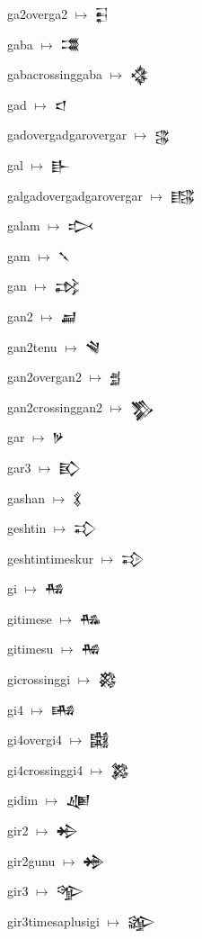{\noindent ga2overga2 $\mapsto$ {\cufont 𒃭}\par
\noindent gaba $\mapsto$ {\cufont 𒃮}\par
\noindent gabacrossinggaba $\mapsto$ {\cufont 𒃯}\par
\noindent gad $\mapsto$ {\cufont 𒃰}\par
\noindent gadovergadgarovergar $\mapsto$ {\cufont 𒃱}\par
\noindent gal $\mapsto$ {\cufont 𒃲}\par
\noindent galgadovergadgarovergar $\mapsto$ {\cufont 𒃳}\par
\noindent galam $\mapsto$ {\cufont 𒃴}\par
\noindent gam $\mapsto$ {\cufont 𒃵}\par
\noindent gan $\mapsto$ {\cufont 𒃶}\par
\noindent gan2 $\mapsto$ {\cufont 𒃷}\par
\noindent gan2tenu $\mapsto$ {\cufont 𒃸}\par
\noindent gan2overgan2 $\mapsto$ {\cufont 𒃹}\par
\noindent gan2crossinggan2 $\mapsto$ {\cufont 𒃺}\par
\noindent gar $\mapsto$ {\cufont 𒃻}\par
\noindent gar3 $\mapsto$ {\cufont 𒃼}\par
\noindent gashan $\mapsto$ {\cufont 𒃽}\par
\noindent geshtin $\mapsto$ {\cufont 𒃾}\par
\noindent geshtintimeskur $\mapsto$ {\cufont 𒃿}\par
\noindent gi $\mapsto$ {\cufont 𒄀}\par
\noindent gitimese $\mapsto$ {\cufont 𒄁}\par
\noindent gitimesu $\mapsto$ {\cufont 𒄂}\par
\noindent gicrossinggi $\mapsto$ {\cufont 𒄃}\par
\noindent gi4 $\mapsto$ {\cufont 𒄄}\par
\noindent gi4overgi4 $\mapsto$ {\cufont 𒄅}\par
\noindent gi4crossinggi4 $\mapsto$ {\cufont 𒄆}\par
\noindent gidim $\mapsto$ {\cufont 𒄇}\par
\noindent gir2 $\mapsto$ {\cufont 𒄈}\par
\noindent gir2gunu $\mapsto$ {\cufont 𒄉}\par
\noindent gir3 $\mapsto$ {\cufont 𒄊}\par
\noindent gir3timesaplusigi $\mapsto$ {\cufont 𒄋}\par
}
